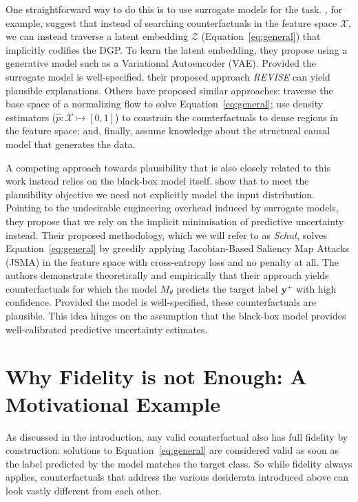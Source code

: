 One straightforward way to do this is to use surrogate models for the task. \citet{joshi2019realistic}, for example, suggest that instead of searching counterfactuals in the feature space $\mathcal{X}$, we can instead traverse a latent embedding $\mathcal{Z}$ (Equation~\ref{eq:general}) that implicitly codifies the DGP. To learn the latent embedding, they propose using a generative model such as a Variational Autoencoder (VAE). Provided the surrogate model is well-specified, their proposed approach \textit{REVISE} can yield plausible explanations. Others have proposed similar approaches: \citet{dombrowski2021diffeomorphic} traverse the base space of a normalizing flow to solve Equation~\ref{eq:general}; \citet{poyiadzi2020face} use density estimators ($\hat{p}: \mathcal{X} \mapsto [0,1]$) to constrain the counterfactuals to dense regions in the feature space; and, finally, \citet{karimi2021algorithmic} assume knowledge about the structural causal model that generates the data.

A competing approach towards plausibility that is also closely related to this work instead relies on the black-box model itself. \citet{schut2021generating} show that to meet the plausibility objective we need not explicitly model the input distribution. Pointing to the undesirable engineering overhead induced by surrogate models, they propose that we rely on the implicit minimisation of predictive uncertainty instead. Their proposed methodology, which we will refer to as \textit{Schut}, solves Equation~\ref{eq:general} by greedily applying Jacobian-Based Saliency Map Attacks (JSMA) in the feature space with cross-entropy loss and no penalty at all. The authors demonstrate theoretically and empirically that their approach yields counterfactuals for which the model $M_{\theta}$ predicts the target label $\mathbf{y}^+$ with high confidence. Provided the model is well-specified, these counterfactuals are plausible. This idea hinges on the assumption that the black-box model provides well-calibrated predictive uncertainty estimates.

\section{Why Fidelity is not Enough: A Motivational Example}\label{fidelity}

As discussed in the introduction, any valid counterfactual also has full fidelity by construction: solutions to Equation~\ref{eq:general} are considered valid as soon as the label predicted by the model matches the target class. So while fidelity always applies, counterfactuals that address the various desiderata introduced above can look vastly different from each other. 

